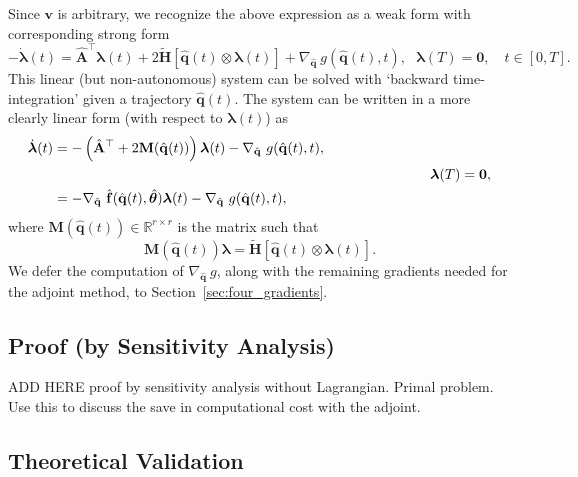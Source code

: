 Since $\mathbf{v}$ is arbitrary, we recognize the above expression as a weak form with corresponding strong form\\
\begin{equation*}
    -\dot{\bm{\lambda}}(t) = \hat{\mathbf{A}}^{\top} \bm{\lambda}(t) + 2\tilde{\mathbf{H}}[\hat{\mathbf{q}}(t)\otimes \bm{\lambda}(t)] + \nabla_{\hat{\mathbf{q}}}~g(\hat{\mathbf{q}}(t),t),~~~\bm{\lambda}(T)=\bm{0},\quad t\in [0,T].
\end{equation*}
This linear (but non-autonomous) system can be solved with `backward time-integration' given a trajectory $\hat{\mathbf{q}}(t)$. The system can be written in a more clearly linear form (with respect to $\bm{\lambda}(t)$) as\\
\begin{align}
    \label{eq:gradient_fq}
     \dot{\bm{\lambda}}(t) &= -\left(\hat{\mathbf{A}}^{\top} + 2\mathbf{M}(\hat{\mathbf{q}}(t))\right)\bm{\lambda}(t) - \nabla_{\hat{\mathbf{q}}}~g(\hat{\mathbf{q}}(t),t),\notag\\
    &~\hspace{8.8cm}~~~~~\bm{\lambda}(T)=\bm{0},\\
    &= -\nabla_{\hat{\mathbf{q}}}~\hat{\mathbf{f}}(\hat{\mathbf{q}}(t),\hat{\bm{\theta}})\bm{\lambda}(t) - \nabla_{\hat{\mathbf{q}}}~g(\hat{\mathbf{q}}(t),t)\notag,
\end{align}
where $\mathbf{M}(\hat{\mathbf{q}}(t))\in\mathbb{R}^{r\times r}$ is the matrix such that\\
\begin{equation*}
    \mathbf{M}(\hat{\mathbf{q}}(t)) \bm{\lambda} = \tilde{\mathbf{H}}[\hat{\mathbf{q}}(t)\otimes \bm{\lambda}(t)].
\end{equation*}
We defer the computation of $\nabla_{\hat{\mathbf{q}}}~g$, along with the remaining gradients needed for the adjoint method, to Section~\ref{sec:four_gradients}.




\subsection*{Proof (by Sensitivity Analysis)}

ADD HERE proof by sensitivity analysis without Lagrangian. Primal problem. Use this to discuss the save in computational cost with the adjoint.


\subsection*{Theoretical Validation}

